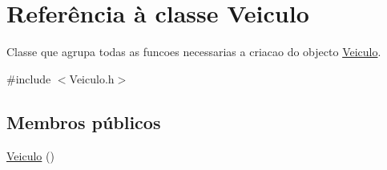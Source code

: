\hypertarget{class_veiculo}{\section{Referência à classe Veiculo}
\label{class_veiculo}
}


Classe que agrupa todas as funcoes necessarias a criacao do objecto \hyperlink{class_veiculo}{Veiculo}.  




{\ttfamily \#include $<$Veiculo.\-h$>$}

\subsection*{Membros públicos}
\begin{DoxyCompactItemize}
\item 
\hypertarget{class_veiculo_aafab27708a2639bc83a4c3721e57d196}{\hyperlink{class_veiculo_aafab27708a2639bc83a4c3721e57d196}{Veiculo} ()}\label{class_veiculo_aafab27708a2639bc83a4c3721e57d196}


\end{DoxyCompactItemize}
